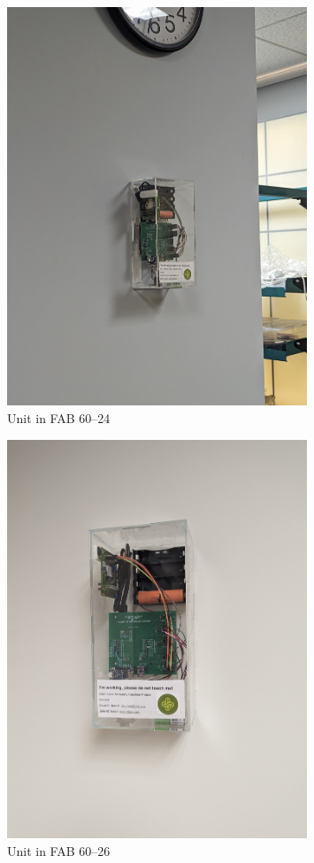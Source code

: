 \begin{figure}
    \centering
    \includegraphics[width=0.8\textwidth]{Pictures/60 24 unit.jpg}
    \caption[Unit in FAB 60--24]{Unit in FAB 60--24}
    \label{fig:Unit in FAB 60--24}
\end{figure}

\begin{figure}
    \centering
    \includegraphics[width=0.8\textwidth]{Pictures/60 26 unit.jpg}
    \caption[Unit in FAB 60--26]{Unit in FAB 60--26}
    \label{fig:Unit in FAB 60--26}
\end{figure}